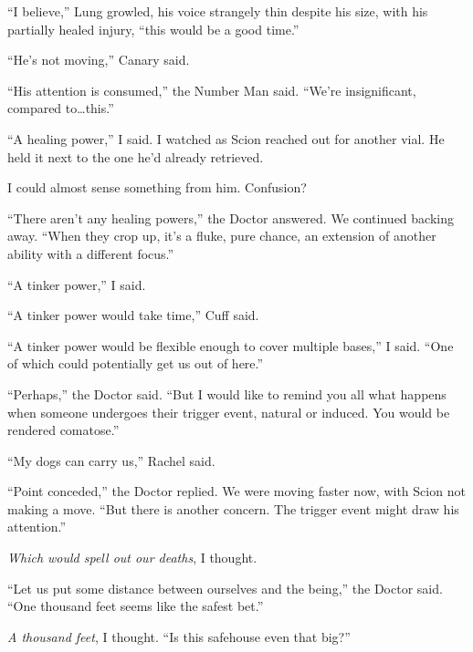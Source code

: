 ``I believe,'' Lung growled, his voice strangely thin despite his size, with his partially healed injury, ``this would be a good time.''



``He's not moving,'' Canary said.



``His attention is consumed,'' the Number Man said.  ``We're insignificant, compared to\ldots this.''



``A healing power,'' I said.  I watched as Scion reached out for another vial.  He held it next to the one he'd already retrieved.



I could almost sense something from him.  Confusion?



``There aren't any healing powers,'' the Doctor answered.  We continued backing away.  ``When they crop up, it's a fluke, pure chance, an extension of another ability with a different focus.''



``A tinker power,'' I said.



``A tinker power would take time,'' Cuff said.



``A tinker power would be flexible enough to cover multiple bases,'' I said.  ``One of which could potentially get us out of here.''



``Perhaps,'' the Doctor said.  ``But I would like to remind you all what happens when someone undergoes their trigger event, natural or induced.  You would be rendered comatose.''



``My dogs can carry us,'' Rachel said.



``Point conceded,'' the Doctor replied.  We were moving faster now, with Scion not making a move.  ``But there is another concern.  The trigger event might draw his attention.''



\emph{Which would spell out our deaths}, I thought.



``Let us put some distance between ourselves and the being,'' the Doctor said.  ``One thousand feet seems like the safest bet.''



\emph{A thousand feet}, I thought.  ``Is this safehouse even that big?''



